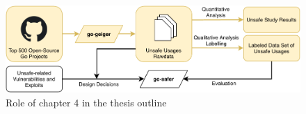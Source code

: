 \begin{figure}[htp!]
    \includegraphics[width=\textwidth]{assets/figures/chapter4/outline4.pdf}
    \caption{Role of chapter 4 in the thesis outline}
    \label{fig:outline4}
\end{figure}
